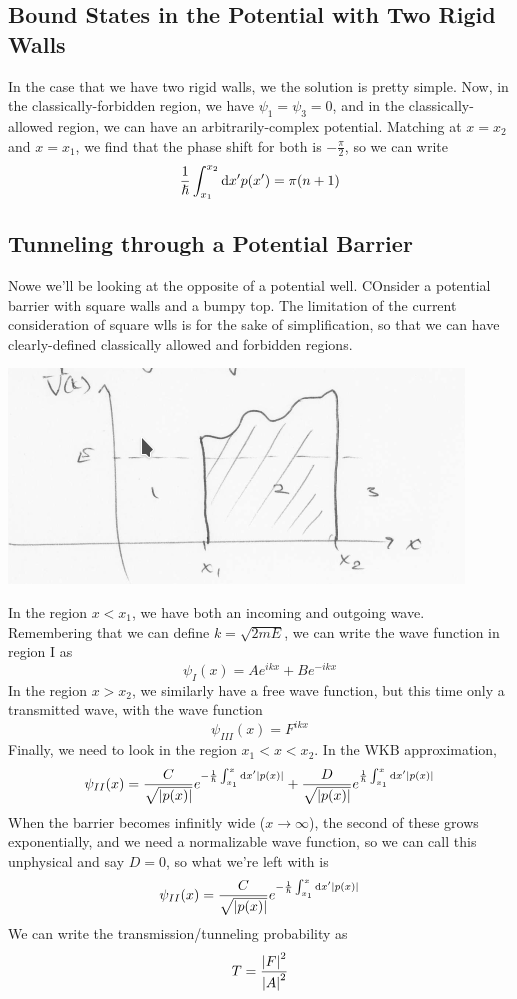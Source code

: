 \documentclass[a4paper]{article}
\begin{document}
\subsection{Bound States in the Potential with Two Rigid Walls}
In the case that we have two rigid walls, we the solution is pretty simple.
Now, in the classically-forbidden region, we have $\psi_1 = \psi_3 = 0$, and in
the classically-allowed region, we can have an arbitrarily-complex potential.
Matching at $x = x_2$ and $x=x_1$, we find that the phase shift for both is
$-\frac{\pi}{2}$, so we can write
\[
	\frac{1}{\hslash} \int_{x_1}^{x_2} \mathrm{d} x' p(x') =
	\pi(n+1)
\]

\subsection{Tunneling through a Potential Barrier}

Nowe we'll be looking at the opposite of a potential well. COnsider a potential
barrier with square walls and a bumpy top. The limitation of the current
consideration of square wlls is for the sake of simplification, so that we can
have clearly-defined classically allowed and forbidden regions.
\begin{center}
	\includegraphics[width=.6\textwidth]{Tunnelling_WKB.png}
\end{center}
In the region $x<x_1$, we have both an incoming and outgoing wave. Remembering
that we can define $k=\sqrt{2mE}$, we can write the wave function in region I
as
\[
	\psi_I(x)  = Ae^{ikx} + Be^{-ikx}
\]
In the region $x>x_2$, we similarly have a free wave function, but this time
only a transmitted wave, with the wave function
\[
	\psi_{III}(x) = F^{ikx}
\]
Finally, we need to look in the region $x_1<x<x_2$. In the WKB approximation,
\[
	\psi_{II}(x) = \frac{C}{\sqrt{\left\lvert p(x)\right\rvert}} e^{-\frac{1}{\hslash}
	\int_{x_1}^x\mathrm{d} x'\left\lvert p(x)\right\rvert} +
	\frac{D}{\sqrt{\left\lvert p(x)\right\rvert}} e^{\frac{1}{\hslash}
	\int_{x_1}^x\mathrm{d} x'\left\lvert p(x)\right\rvert}
\]
When the barrier becomes infinitly wide ($x\to\infty$), the second of these
grows exponentially, and we need a normalizable wave function, so we can call
this unphysical and say $D=0$, so what we're left with is
\[
	\psi_{II}(x) = \frac{C}{\sqrt{\left\lvert p(x)\right\rvert}} e^{-\frac{1}{\hslash}
	\int_{x_1}^x\mathrm{d} x'\left\lvert p(x)\right\rvert}
\]
We can write the transmission/tunneling probability as
\[
	T = \frac{\left\lvert F\right\rvert^2}{\left\lvert A\right\rvert^2}
\]
\end{document}
